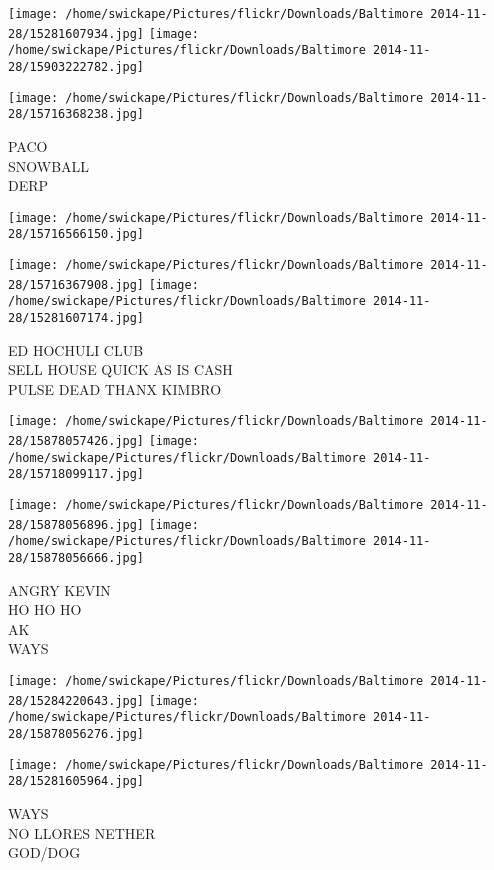 \documentclass[10pt,letterpaper]{article}
\begin{document}
\texttt{[image: /home/swickape/Pictures/flickr/Downloads/Baltimore 2014-11-28/15281607934.jpg]}
\texttt{[image: /home/swickape/Pictures/flickr/Downloads/Baltimore 2014-11-28/15903222782.jpg]}

\texttt{[image: /home/swickape/Pictures/flickr/Downloads/Baltimore 2014-11-28/15716368238.jpg]}

PACO\\
SNOWBALL\\
DERP\\
\pagebreak

\texttt{[image: /home/swickape/Pictures/flickr/Downloads/Baltimore 2014-11-28/15716566150.jpg]}

\vspace{0.25in}
\texttt{[image: /home/swickape/Pictures/flickr/Downloads/Baltimore 2014-11-28/15716367908.jpg]}
\texttt{[image: /home/swickape/Pictures/flickr/Downloads/Baltimore 2014-11-28/15281607174.jpg]}

ED HOCHULI CLUB\\
SELL HOUSE QUICK AS IS CASH\\
PULSE DEAD THANX KIMBRO\\
\pagebreak

\texttt{[image: /home/swickape/Pictures/flickr/Downloads/Baltimore 2014-11-28/15878057426.jpg]}
\texttt{[image: /home/swickape/Pictures/flickr/Downloads/Baltimore 2014-11-28/15718099117.jpg]}

\texttt{[image: /home/swickape/Pictures/flickr/Downloads/Baltimore 2014-11-28/15878056896.jpg]}
\texttt{[image: /home/swickape/Pictures/flickr/Downloads/Baltimore 2014-11-28/15878056666.jpg]}

ANGRY KEVIN\\
HO HO HO\\
AK\\
WAYS\\
\pagebreak

\texttt{[image: /home/swickape/Pictures/flickr/Downloads/Baltimore 2014-11-28/15284220643.jpg]}
\texttt{[image: /home/swickape/Pictures/flickr/Downloads/Baltimore 2014-11-28/15878056276.jpg]}

\vspace{0.25in}
\texttt{[image: /home/swickape/Pictures/flickr/Downloads/Baltimore 2014-11-28/15281605964.jpg]}

WAYS\\
NO LLORES NETHER\\
GOD/DOG\\
\pagebreak
\end{document}
